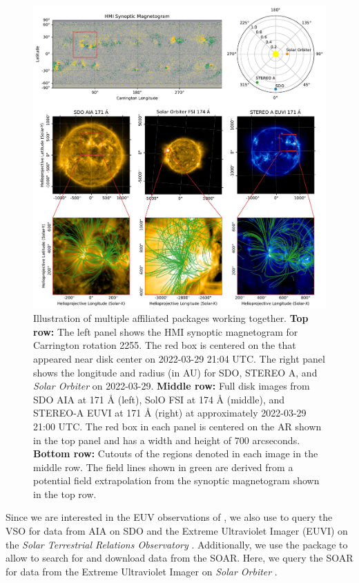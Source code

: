 \begin{figure}
    \centering
    \includegraphics[width=\columnwidth]{figures/loops-multi-viewpoint.pdf}
    \caption{Illustration of multiple affiliated packages working together.
             \textbf{Top row:} The left panel shows the HMI synoptic magnetogram for Carrington rotation 2255. The red box is centered on the \AR that appeared near disk center on 2022-03-29 21:04 UTC. The right panel shows the \hgs longitude and radius (in AU) for SDO, STEREO A, and \textit{Solar Orbiter} on 2022-03-29.
             \textbf{Middle row:} Full disk images from SDO AIA at 171 Å (left), SolO FSI at 174 Å (middle), and STEREO-A EUVI at 171 Å (right) at approximately 2022-03-29 21:00 UTC.
             The red box in each panel is centered on the AR shown in the top panel and has a width and height of 700 arcseconds.
             \textbf{Bottom row:} Cutouts of the regions denoted in each image in the middle row.
             The field lines shown in green are derived from a potential field extrapolation from the synoptic magnetogram shown in the top row.
    }
    \label{fig:affiliated-package-showcase}
\end{figure}

Since we are interested in the EUV observations of , we also use \Fido to query the VSO for data from AIA on SDO and the Extreme Ultraviolet Imager (EUVI) on the \textit{Solar Terrestrial Relations Observatory} \citep[STEREO,][]{howard_sun_2008}.
Additionally, we use the  package to allow \Fido to search for and download data from the SOAR.
Here, we query the SOAR for data from the Extreme Ultraviolet Imager \citep[EUI,][]{rochus_solar_2020} on \textit{Solar Orbiter} \citep{muller_solar_2020}.

